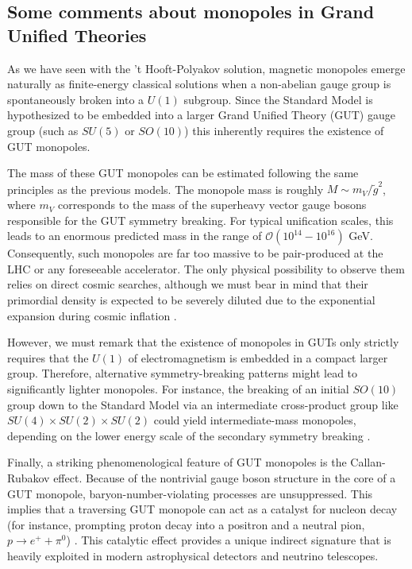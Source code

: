 \documentclass[a4paper,11pt]{article}
\begin{document}
\subsection{Some comments about monopoles in Grand Unified Theories}
As we have seen with the 't Hooft-Polyakov solution, magnetic monopoles emerge naturally as finite-energy classical solutions when a non-abelian gauge group is spontaneously broken into a $U(1)$ subgroup. Since the Standard Model is hypothesized to be embedded into a larger  Grand Unified Theory (GUT) gauge group \cite{GeorgiGlashow1974} (such as $SU(5)$ or $SO(10)$) this inherently requires the existence of GUT monopoles.

The mass of these GUT monopoles can be estimated following the same principles as the previous models. The monopole mass is roughly $M \sim m_{V}/\tilde{g}^{2}$, where $m_{V}$ corresponds to the mass of the superheavy vector gauge bosons responsible for the GUT symmetry breaking. For typical unification scales, this leads to an enormous predicted mass in the range of $\mathcal{O}(10^{14}-10^{16})$ GeV. Consequently, such monopoles are far too massive to be pair-produced at the LHC or any foreseeable accelerator. The only physical possibility to observe them relies on direct cosmic searches, although we must bear in mind that their primordial density is expected to be severely diluted due to the exponential expansion during cosmic inflation \cite{Guth1981}.

However, we must remark that the existence of monopoles in GUTs only strictly requires that the $U(1)$ of electromagnetism is embedded in a compact larger group. Therefore, alternative symmetry-breaking patterns might lead to significantly lighter monopoles. For instance, the breaking of an initial $SO(10)$ group down to the Standard Model via an intermediate cross-product group like $SU(4) \times SU(2) \times SU(2)$ could yield intermediate-mass monopoles, depending on the lower energy scale of the secondary symmetry breaking \cite{Lazarides1980}.

Finally, a striking phenomenological feature of GUT monopoles is the Callan-Rubakov effect. Because of the nontrivial gauge boson structure in the core of a GUT monopole, baryon-number-violating processes are unsuppressed. This implies that a traversing GUT monopole can act as a catalyst for nucleon decay (for instance, prompting proton decay into a positron and a neutral pion, $p \rightarrow e^{+} + \pi^{0}$) \cite{Rubakov1981}. This catalytic effect provides a unique indirect signature that is heavily exploited in modern astrophysical detectors and neutrino telescopes.
\end{document}
